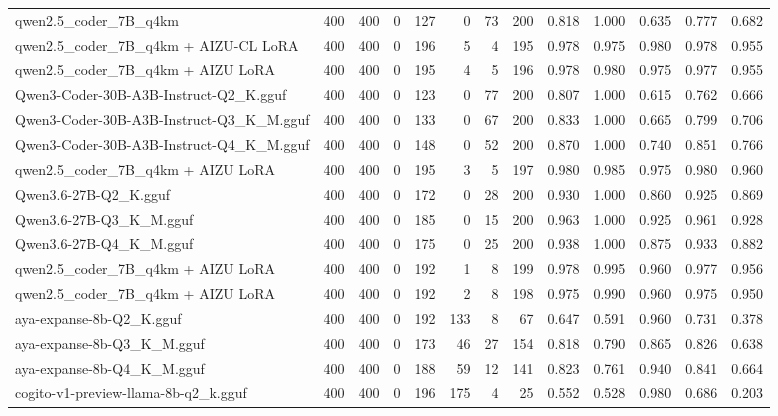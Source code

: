 \begin{table}[htbp]
{\begin{tabular}{lrrrrrrrrrrrr}
    qwen2.5\_coder\_7B\_q4km & 400 & 400 & 0 & 127 & 0 & 73 & 200 & 0.818 & 1.000 & 0.635 & 0.777 & 0.682 \\
    qwen2.5\_coder\_7B\_q4km + AIZU-CL LoRA & 400 & 400 & 0 & 196 & 5 & 4 & 195 & 0.978 & 0.975 & 0.980 & 0.978 & \cellcolor{green!30}0.955 \\
    qwen2.5\_coder\_7B\_q4km + AIZU LoRA & 400 & 400 & 0 & 195 & 4 & 5 & 196 & 0.978 & 0.980 & 0.975 & 0.977 & \cellcolor{green!20}0.955 \\
    Qwen3-Coder-30B-A3B-Instruct-Q2\_K.gguf & 400 & 400 & 0 & 123 & 0 & 77 & 200 & 0.807 & 1.000 & 0.615 & 0.762 & 0.666 \\
    Qwen3-Coder-30B-A3B-Instruct-Q3\_K\_M.gguf & 400 & 400 & 0 & 133 & 0 & 67 & 200 & 0.833 & 1.000 & 0.665 & 0.799 & 0.706 \\
    Qwen3-Coder-30B-A3B-Instruct-Q4\_K\_M.gguf & 400 & 400 & 0 & 148 & 0 & 52 & 200 & 0.870 & 1.000 & 0.740 & 0.851 & 0.766 \\
    qwen2.5\_coder\_7B\_q4km + AIZU LoRA & 400 & 400 & 0 & 195 & 3 & 5 & 197 & 0.980 & 0.985 & 0.975 & 0.980 & \cellcolor{green!50}0.960 \\
    Qwen3.6-27B-Q2\_K.gguf & 400 & 400 & 0 & 172 & 0 & 28 & 200 & 0.930 & 1.000 & 0.860 & 0.925 & 0.869 \\
    Qwen3.6-27B-Q3\_K\_M.gguf & 400 & 400 & 0 & 185 & 0 & 15 & 200 & 0.963 & 1.000 & 0.925 & 0.961 & 0.928 \\
    Qwen3.6-27B-Q4\_K\_M.gguf & 400 & 400 & 0 & 175 & 0 & 25 & 200 & 0.938 & 1.000 & 0.875 & 0.933 & 0.882 \\
    qwen2.5\_coder\_7B\_q4km + AIZU LoRA & 400 & 400 & 0 & 192 & 1 & 8 & 199 & 0.978 & 0.995 & 0.960 & 0.977 & \cellcolor{green!40}0.956 \\
    qwen2.5\_coder\_7B\_q4km + AIZU LoRA & 400 & 400 & 0 & 192 & 2 & 8 & 198 & 0.975 & 0.990 & 0.960 & 0.975 & \cellcolor{green!10}0.950 \\
    aya-expanse-8b-Q2\_K.gguf & 400 & 400 & 0 & 192 & 133 & 8 & 67 & 0.647 & 0.591 & 0.960 & 0.731 & 0.378 \\
    aya-expanse-8b-Q3\_K\_M.gguf & 400 & 400 & 0 & 173 & 46 & 27 & 154 & 0.818 & 0.790 & 0.865 & 0.826 & 0.638 \\
    aya-expanse-8b-Q4\_K\_M.gguf & 400 & 400 & 0 & 188 & 59 & 12 & 141 & 0.823 & 0.761 & 0.940 & 0.841 & 0.664 \\
    cogito-v1-preview-llama-8b-q2\_k.gguf & 400 & 400 & 0 & 196 & 175 & 4 & 25 & 0.552 & 0.528 & 0.980 & 0.686 & 0.203 \\

\end{tabular}}
\end{table}
